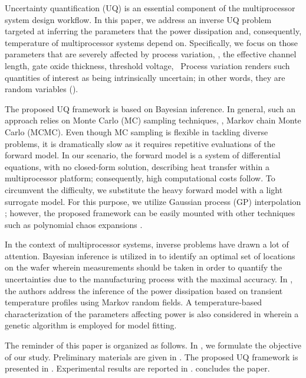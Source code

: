 Uncertainty quantification (UQ) is an essential component of the multiprocessor system design workflow. In this paper, we address an inverse UQ problem targeted at inferring the parameters that the power dissipation and, consequently, temperature of multiprocessor systems depend on. Specifically, we focus on those parameters that are severely affected by process variation, \eg, the effective channel length, gate oxide thickness, threshold voltage, \etc\ Process variation renders such quantities of interest as being intrinsically uncertain; in other words, they are random variables (\rvs).

The proposed UQ framework is based on Bayesian inference. In general, such an approach relies on Monte Carlo (MC) sampling techniques, \eg, Markov chain Monte Carlo (MCMC). Even though MC sampling is flexible in tackling diverse problems, it is dramatically slow as it requires repetitive evaluations of the forward model. In our scenario, the forward model is a system of differential equations, with no closed-form solution, describing heat transfer within a multiprocessor platform; consequently, high computational costs follow. To circumvent the difficulty, we substitute the heavy forward model with a light surrogate model. For this purpose, we utilize Gaussian process (GP) interpolation \cite{mackay2003, rasmussen2006}; however, the proposed framework can be easily mounted with other techniques such as polynomial chaos expansions \cite{marzouk2009}.

In the context of multiprocessor systems, inverse problems have drawn a lot of attention. Bayesian inference is utilized in \cite{zhang2010} to identify an optimal set of locations on the wafer wherein measurements should be taken in order to quantify the uncertainties due to the manufacturing process with the maximal accuracy. In \cite{paek2012}, the authors address the inference of the power dissipation based on transient temperature profiles using Markov random fields. A temperature-based characterization of the parameters affecting power is also considered in \cite{mesa-martinez2007} wherein a genetic algorithm is employed for model fitting.

The reminder of this paper is organized as follows. In , we formulate the objective of our study. Preliminary materials are given in . The proposed UQ framework is presented in . Experimental results are reported in .  concludes the paper.
